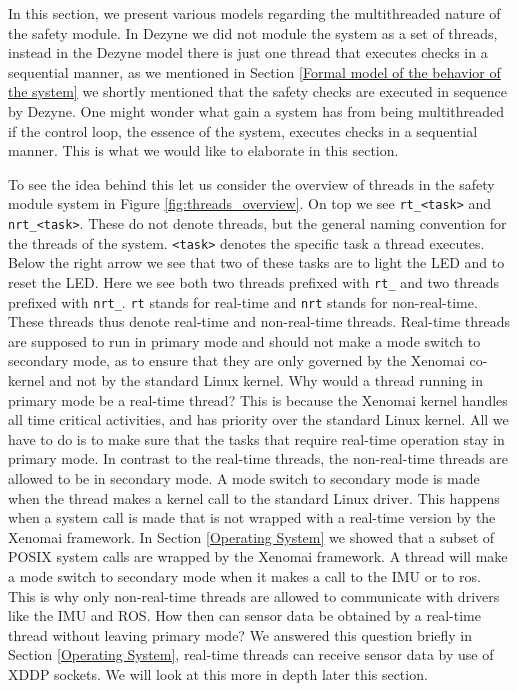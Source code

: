 \documentclass[12pt]{scrreprt}
\begin{document}
In this section, we present various models regarding the multithreaded nature of the safety module. In Dezyne we did not module the system as a set of threads, instead in the Dezyne model there is just one thread that executes checks in a sequential manner, as we mentioned in Section \ref{Formal model of the behavior of the system} we shortly mentioned that the safety checks are executed in sequence by Dezyne. One might wonder what gain a system has from being multithreaded if the control loop, the essence of the system, executes checks in a sequential manner. This is what we would like to elaborate in this section.
\par
To see the idea behind this let us consider the overview of threads in the safety module system in Figure \ref{fig:threads_overview}. On top we see \texttt{rt\_<task>} and \texttt{nrt\_<task>}. These do not denote threads, but the general naming convention for the threads of the system. \texttt{<task>} denotes the specific task a thread executes. Below the right arrow we see that two of these tasks are to light the LED and to reset the LED. Here we see both two threads prefixed with \texttt{rt\_} and two threads prefixed with \texttt{nrt\_}. \texttt{rt} stands for real-time and \texttt{nrt} stands for non-real-time. These threads thus denote real-time and non-real-time threads. Real-time threads are supposed to run in primary mode and should not make a mode switch to secondary mode, as to ensure that they are only governed by the Xenomai co-kernel and not by the standard Linux kernel. Why would a thread running in primary mode be a real-time thread? This is because the Xenomai kernel handles all time critical activities, and has priority over the standard Linux kernel. All we have to do is to make sure that the tasks that require real-time operation stay in primary mode. In contrast to the real-time threads, the non-real-time threads are allowed to be in secondary mode. A mode switch to secondary mode is made when the thread makes a kernel call to the standard Linux driver. This happens when a system call is made that is not wrapped with a real-time version by the Xenomai framework. In Section \ref{Operating System} we showed that a subset of POSIX system calls are wrapped by the Xenomai framework. A thread will make a mode switch to secondary mode when it makes a call to the IMU or to \acrshort{ros}. This is why only non-real-time threads are allowed to communicate with drivers like the IMU and ROS. How then can sensor data be obtained by a real-time thread without leaving primary mode? We answered this question briefly in Section \ref{Operating System}, real-time threads can receive sensor data by use of XDDP sockets. We will look at this more in depth later this section.
\end{document}

